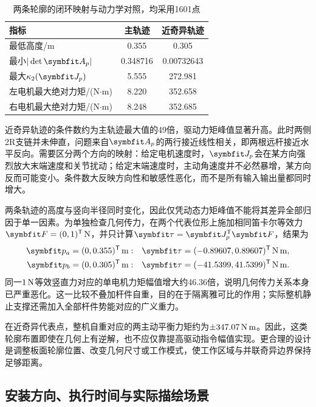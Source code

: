 \begin{table}[htbp]
\centering\caption{两条轮廓的闭环映射与动力学对照，均采用1601点}\label{tab:paths}
\small\begin{tabularx}{\linewidth}{@{}Xcc@{}}\toprule 指标 & 主轨迹 & 近奇异轨迹\\\midrule
最低高度/m & 0.355 & 0.305\\
最小$|\det\vect A_p|$ & 0.348716 & 0.00732643\\
最大$\kappa_2(\vect J_p)$ & 5.555 & 272.981\\
左电机最大绝对力矩/(N$\cdot$m) & 8.220 & 352.658\\
右电机最大绝对力矩/(N$\cdot$m) & 8.248 & 352.685\\\bottomrule
\end{tabularx}
\end{table}

近奇异轨迹的条件数约为主轨迹最大值的49倍，驱动力矩峰值显著升高。此时两侧2R支链并未伸直，问题来自$\vect A_p$的两行接近线性相关，即两根远杆接近水平反向。需要区分两个方向的映射：给定电机速度时，$\vect J_p$会在某方向强烈放大末端速度和关节扰动；给定末端速度时，主动角速度并不必然暴增，某方向反而可能变小。条件数大反映方向性和敏感性恶化，而不是所有输入输出量都同时增大。


两条轨迹的高度与竖向半径同时变化，因此仅凭动态力矩峰值不能将其差异全部归因于单一因素。为单独检查几何传力，在两个代表位形上施加相同笛卡尔等效力$\vect F=(0,1)^\T\units N$，并只计算$\vect\tau=\vect J_p^\T\vect F$，结果为
\begin{align}
\vect p_a=(0,0.355)^\T\units m:&\quad \vect\tau=(-0.89607,0.89607)^\T\units{N\,m},\\
\vect p_b=(0,0.305)^\T\units m:&\quad \vect\tau=(-41.5399,41.5399)^\T\units{N\,m}.
\end{align}
同一$1\,\mathrm{N}$等效竖直力对应的单电机力矩幅值增大约46.36倍，说明几何传力关系本身已严重恶化。这一比较不叠加杆件自重，目的在于隔离雅可比的作用；实际整机静止支撑还需加入全部杆件势能对应的广义重力。

在近奇异代表点，整机自重对应的两主动平衡力矩约为$\pm347.07\,\mathrm{N\,m}$。因此，这类轮廓布置即使在几何上有逆解，也不应仅靠提高驱动指令幅值实现。更合理的设计是调整板面轮廓位置、改变几何尺寸或工作模式，使工作区域与并联奇异边界保持足够距离。

\subsection{安装方向、执行时间与实际描绘场景}
\label{sec:scenario}

